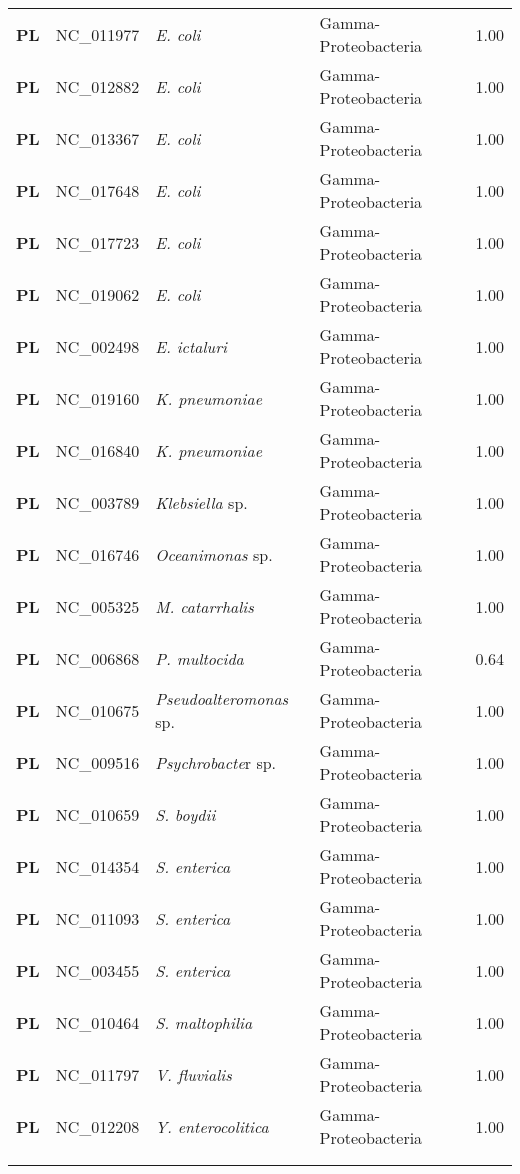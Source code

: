 \begin{adjustwidth}{-3cm}{2cm}
{\begin{supertabular}{>{\bfseries}l|p{0.1\textwidth}p{0.14\textwidth}l|l}
PL & NC\_011977 & \textit{E. coli} & Gamma-Proteobacteria & 1.00\\
PL & NC\_012882 & \textit{E. coli} & Gamma-Proteobacteria & 1.00\\
PL & NC\_013367 & \textit{E. coli} & Gamma-Proteobacteria & 1.00\\
PL & NC\_017648 & \textit{E. coli} & Gamma-Proteobacteria & 1.00\\
PL & NC\_017723 & \textit{E. coli} & Gamma-Proteobacteria & 1.00\\
PL & NC\_019062 & \textit{E. coli} & Gamma-Proteobacteria & 1.00\\
PL & NC\_002498 & \textit{E. ictaluri} & Gamma-Proteobacteria & 1.00\\
PL & NC\_019160 & \textit{K. pneumoniae} & Gamma-Proteobacteria & 1.00\\
PL & NC\_016840 & \textit{K. pneumoniae} & Gamma-Proteobacteria & 1.00\\
PL & NC\_003789 & \textit{Klebsiella} sp. & Gamma-Proteobacteria & 1.00\\
PL & NC\_016746 & \textit{Oceanimonas} sp. & Gamma-Proteobacteria & 1.00\\
PL & NC\_005325 & \textit{M. catarrhalis} & Gamma-Proteobacteria & 1.00\\
PL & NC\_006868 & \textit{P. multocida} & Gamma-Proteobacteria & 0.64\\
PL & NC\_010675 & \textit{Pseudoalteromonas} sp. & Gamma-Proteobacteria & 1.00\\
PL & NC\_009516 & \textit{Psychrobacte}r sp. & Gamma-Proteobacteria & 1.00\\
PL & NC\_010659 & \textit{S. boydii} & Gamma-Proteobacteria & 1.00\\
PL & NC\_014354 & \textit{S. enterica} & Gamma-Proteobacteria & 1.00\\
PL & NC\_011093 & \textit{S. enterica} & Gamma-Proteobacteria & 1.00\\
PL & NC\_003455 & \textit{S. enterica} & Gamma-Proteobacteria & 1.00\\
PL & NC\_010464 & \textit{S. maltophilia} & Gamma-Proteobacteria & 1.00\\
PL & NC\_011797 & \textit{V. fluvialis} & Gamma-Proteobacteria & 1.00\\
PL & NC\_012208 & \textit{Y. enterocolitica} & Gamma-Proteobacteria & 1.00\\
\\
\\

\end{supertabular}}
\end{adjustwidth}
